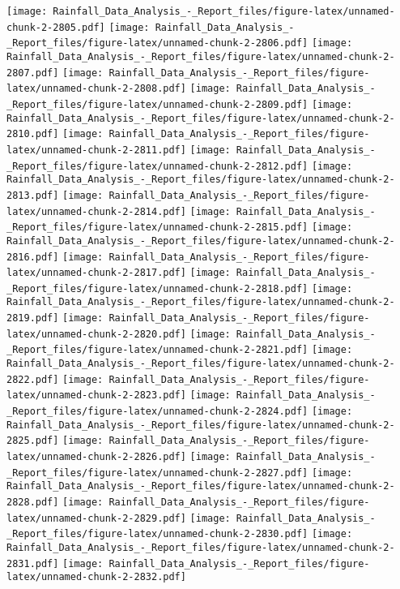 \documentclass[
]{article}
\begin{document}
\texttt{[image: Rainfall\_Data\_Analysis\_-\_Report\_files/figure-latex/unnamed-chunk-2-2805.pdf]}
\texttt{[image: Rainfall\_Data\_Analysis\_-\_Report\_files/figure-latex/unnamed-chunk-2-2806.pdf]}
\texttt{[image: Rainfall\_Data\_Analysis\_-\_Report\_files/figure-latex/unnamed-chunk-2-2807.pdf]}
\texttt{[image: Rainfall\_Data\_Analysis\_-\_Report\_files/figure-latex/unnamed-chunk-2-2808.pdf]}
\texttt{[image: Rainfall\_Data\_Analysis\_-\_Report\_files/figure-latex/unnamed-chunk-2-2809.pdf]}
\texttt{[image: Rainfall\_Data\_Analysis\_-\_Report\_files/figure-latex/unnamed-chunk-2-2810.pdf]}
\texttt{[image: Rainfall\_Data\_Analysis\_-\_Report\_files/figure-latex/unnamed-chunk-2-2811.pdf]}
\texttt{[image: Rainfall\_Data\_Analysis\_-\_Report\_files/figure-latex/unnamed-chunk-2-2812.pdf]}
\texttt{[image: Rainfall\_Data\_Analysis\_-\_Report\_files/figure-latex/unnamed-chunk-2-2813.pdf]}
\texttt{[image: Rainfall\_Data\_Analysis\_-\_Report\_files/figure-latex/unnamed-chunk-2-2814.pdf]}
\texttt{[image: Rainfall\_Data\_Analysis\_-\_Report\_files/figure-latex/unnamed-chunk-2-2815.pdf]}
\texttt{[image: Rainfall\_Data\_Analysis\_-\_Report\_files/figure-latex/unnamed-chunk-2-2816.pdf]}
\texttt{[image: Rainfall\_Data\_Analysis\_-\_Report\_files/figure-latex/unnamed-chunk-2-2817.pdf]}
\texttt{[image: Rainfall\_Data\_Analysis\_-\_Report\_files/figure-latex/unnamed-chunk-2-2818.pdf]}
\texttt{[image: Rainfall\_Data\_Analysis\_-\_Report\_files/figure-latex/unnamed-chunk-2-2819.pdf]}
\texttt{[image: Rainfall\_Data\_Analysis\_-\_Report\_files/figure-latex/unnamed-chunk-2-2820.pdf]}
\texttt{[image: Rainfall\_Data\_Analysis\_-\_Report\_files/figure-latex/unnamed-chunk-2-2821.pdf]}
\texttt{[image: Rainfall\_Data\_Analysis\_-\_Report\_files/figure-latex/unnamed-chunk-2-2822.pdf]}
\texttt{[image: Rainfall\_Data\_Analysis\_-\_Report\_files/figure-latex/unnamed-chunk-2-2823.pdf]}
\texttt{[image: Rainfall\_Data\_Analysis\_-\_Report\_files/figure-latex/unnamed-chunk-2-2824.pdf]}
\texttt{[image: Rainfall\_Data\_Analysis\_-\_Report\_files/figure-latex/unnamed-chunk-2-2825.pdf]}
\texttt{[image: Rainfall\_Data\_Analysis\_-\_Report\_files/figure-latex/unnamed-chunk-2-2826.pdf]}
\texttt{[image: Rainfall\_Data\_Analysis\_-\_Report\_files/figure-latex/unnamed-chunk-2-2827.pdf]}
\texttt{[image: Rainfall\_Data\_Analysis\_-\_Report\_files/figure-latex/unnamed-chunk-2-2828.pdf]}
\texttt{[image: Rainfall\_Data\_Analysis\_-\_Report\_files/figure-latex/unnamed-chunk-2-2829.pdf]}
\texttt{[image: Rainfall\_Data\_Analysis\_-\_Report\_files/figure-latex/unnamed-chunk-2-2830.pdf]}
\texttt{[image: Rainfall\_Data\_Analysis\_-\_Report\_files/figure-latex/unnamed-chunk-2-2831.pdf]}
\texttt{[image: Rainfall\_Data\_Analysis\_-\_Report\_files/figure-latex/unnamed-chunk-2-2832.pdf]}
\end{document}
